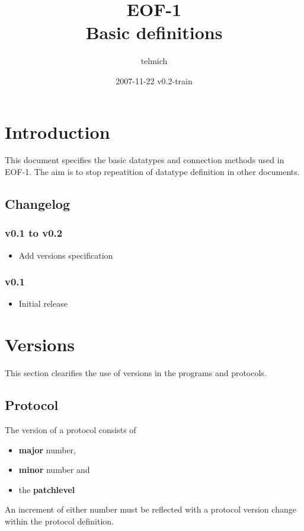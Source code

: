\documentclass[12pt,a4paper]{article}
\begin{document}
\title{EOF-1\\Basic definitions}
\date{2007-11-22 v0.2-train}
\author{telmich}

\maketitle
\tableofcontents
\newpage

\section{Introduction}
This document specifies the basic datatypes and connection
methods used in EOF-1. The aim is to stop repeatition of
datatype definition in other documents.

\subsection{Changelog}
\subsubsection{v0.1 to v0.2}
\begin{itemize}
\item Add versions specification
\end{itemize}
\subsubsection{v0.1}
\begin{itemize}
\item Initial release
\end{itemize}
\section{Versions}
This section clearifies the use of versions in the programs and protocols.
\subsection{Protocol}
The version of a protocol consists of 
\begin{itemize}
\item \textbf{major} number,
\item \textbf{minor} number and
\item the \textbf{patchlevel}
\end{itemize}
An increment of either number must be reflected with a protocol version change
within the protocol definition.
\end{document}

